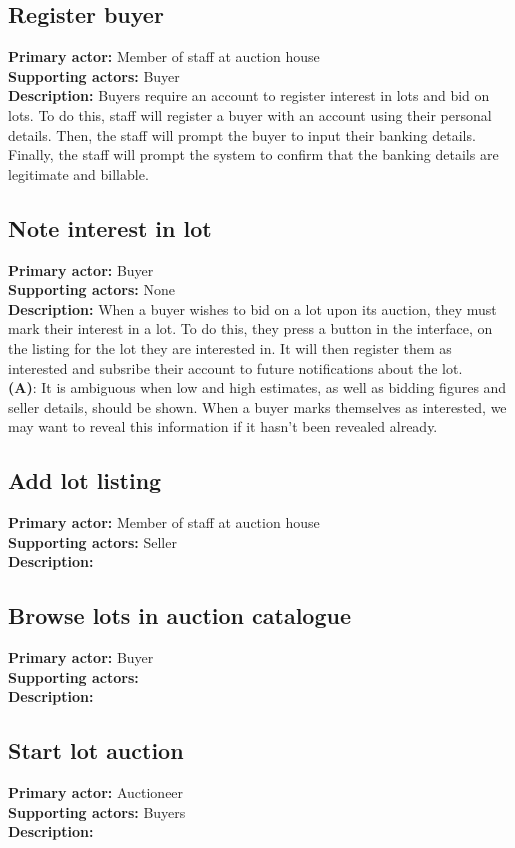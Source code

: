 \documentclass[titlepage, 12pt]{extarticle}
\begin{document}
\subsection{Register buyer}
{\bf Primary actor: } Member of staff at auction house
\\{\bf Supporting actors: } Buyer
\\{\bf Description: } Buyers require an account to register interest in lots and bid on lots. To do this, staff will register a buyer with an account using their personal details. Then, the staff will prompt the buyer to input their banking details. Finally, the staff will prompt the system to confirm that the banking details are legitimate and billable.
\subsection{Note interest in lot}
{\bf Primary actor: } Buyer
\\{\bf Supporting actors: } None
\\{\bf Description: } When a buyer wishes to bid on a lot upon its auction, they must mark their interest in a lot. To do this, they press a button in the interface, on the listing for the lot they are interested in. It will then register them as interested and subsribe their account to future notifications about the lot.
\\{\bf (A)}: It is ambiguous when low and high estimates, as well as bidding figures and seller details, should be shown. When a buyer marks themselves as interested, we may want to reveal this information if it hasn't been revealed already.
\subsection{Add lot listing}
{\bf Primary actor: } Member of staff at auction house
\\{\bf Supporting actors: } Seller
\\{\bf Description: } 
\subsection{Browse lots in auction catalogue}
{\bf Primary actor: } Buyer
\\{\bf Supporting actors: }
\\{\bf Description: } 
\subsection{Start lot auction}
{\bf Primary actor: } Auctioneer
\\{\bf Supporting actors: } Buyers
\\{\bf Description: }
\end{document}
